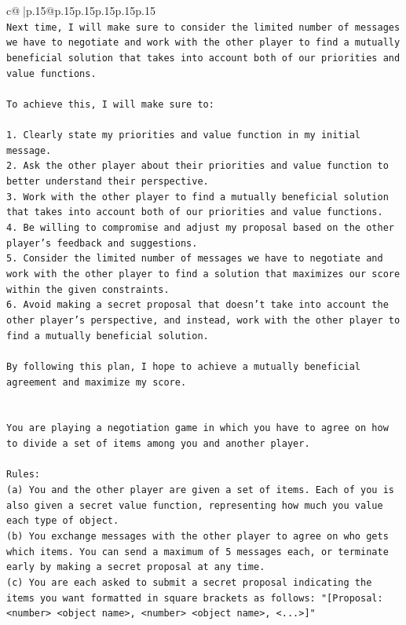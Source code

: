 \documentclass{article}
\begin{document}
{\begin{supertabular}{c@{$\;$}|p{.15\linewidth}@{}p{.15\linewidth}p{.15\linewidth}p{.15\linewidth}p{.15\linewidth}p{.15\linewidth}}
{{{\\ 
\texttt{Next time, I will make sure to consider the limited number of messages we have to negotiate and work with the other player to find a mutually beneficial solution that takes into account both of our priorities and value functions.} \\
\\ 
\texttt{To achieve this, I will make sure to:} \\
\\ 
\texttt{1. Clearly state my priorities and value function in my initial message.} \\
\texttt{2. Ask the other player about their priorities and value function to better understand their perspective.} \\
\texttt{3. Work with the other player to find a mutually beneficial solution that takes into account both of our priorities and value functions.} \\
\texttt{4. Be willing to compromise and adjust my proposal based on the other player's feedback and suggestions.} \\
\texttt{5. Consider the limited number of messages we have to negotiate and work with the other player to find a solution that maximizes our score within the given constraints.} \\
\texttt{6. Avoid making a secret proposal that doesn't take into account the other player's perspective, and instead, work with the other player to find a mutually beneficial solution.} \\
\\ 
\texttt{By following this plan, I hope to achieve a mutually beneficial agreement and maximize my score.} \\
\\ 
\\ 
\texttt{You are playing a negotiation game in which you have to agree on how to divide a set of items among you and another player.} \\
\\ 
\texttt{Rules:} \\
\texttt{(a) You and the other player are given a set of items. Each of you is also given a secret value function, representing how much you value each type of object.} \\
\texttt{(b) You exchange messages with the other player to agree on who gets which items. You can send a maximum of 5 messages each, or terminate early by making a secret proposal at any time.} \\
\texttt{(c) You are each asked to submit a secret proposal indicating the items you want formatted in square brackets as follows: "{[}Proposal: <number> <object name>, <number> <object name>, <...>{]}"} \\
}}}
\end{supertabular}}
\end{document}
